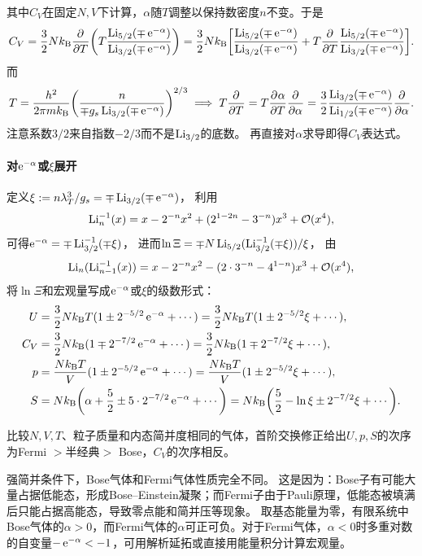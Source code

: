 其中$C_V$在固定$N,V$下计算，$\alpha$随$T$调整以保持数密度$n$不变。于是
\[
	C_V = \frac32Nk_{\mathrm{B}}\frac{\partial^{}}{\partial{T}^{}}\biggl(T\frac{\operatorname{Li}_{5/2}(\mp\mathop{}\!\mathrm{e}^{-\alpha})}{\operatorname{Li}_{3/2}(\mp\mathop{}\!\mathrm{e}^{-\alpha})}\biggr) = \frac32Nk_{\mathrm{B}}\biggl[\frac{\operatorname{Li}_{5/2}(\mp\mathop{}\!\mathrm{e}^{-\alpha})}{\operatorname{Li}_{3/2}(\mp\mathop{}\!\mathrm{e}^{-\alpha})} + T\frac{\partial^{}}{\partial{T}^{}}\frac{\operatorname{Li}_{5/2}(\mp\mathop{}\!\mathrm{e}^{-\alpha})}{\operatorname{Li}_{3/2}(\mp\mathop{}\!\mathrm{e}^{-\alpha})}\biggr].
\]
而
\[
	T = \frac{h^2}{2\pi mk_{\mathrm{B}}}\biggl(\frac{n}{\mp g_s\operatorname{Li}_{3/2}(\mp\mathop{}\!\mathrm{e}^{-\alpha})}\biggr)^{2/3}
	\implies
	T\frac{\partial^{}}{\partial{T}^{}} = T\frac{\partial^{}\alpha}{\partial{T}^{}}\frac{\partial^{}}{\partial{\alpha}^{}} = \frac32\frac{\operatorname{Li}_{3/2}(\mp\mathop{}\!\mathrm{e}^{-\alpha})}{\operatorname{Li}_{1/2}(\mp\mathop{}\!\mathrm{e}^{-\alpha})}\frac{\partial^{}}{\partial{\alpha}^{}}.
\]
注意系数$3/2$来自指数$-2/3$而不是$\operatorname{Li}_{3/2}$的底数。
再直接对$\alpha$求导即得$C_V$表达式。

\paragraph{对$\mathop{}\!\mathrm{e}^{-\alpha}$或$\xi$展开}

定义$\xi := n\lambda_T^3/g_s = \mp\operatorname{Li}_{3/2}(\mp\mathop{}\!\mathrm{e}^{-\alpha})$，
利用
\[
	\operatorname{Li}_n^{-1}(x) = x - 2^{-n}x^2 + (2^{1-2n} - 3^{-n})x^3 + \mathcal{O}(x^4),
\]
可得$\mathop{}\!\mathrm{e}^{-\alpha} = \mp\operatorname{Li}_{3/2}^{-1}(\mp\xi)$，
进而$\ln\Xi = \mp N\operatorname{Li}_{5/2}(\operatorname{Li}_{3/2}^{-1}(\mp\xi))/\xi$，
由
\[
	\operatorname{Li}_n(\operatorname{Li}_{n-1}^{-1}(x)) = x - 2^{-n}x^2 - (2 \cdot 3^{-n} - 4^{1-n})x^3 + \mathcal{O}(x^4),
\]
将$\ln\Xi$和宏观量写成$\mathop{}\!\mathrm{e}^{-\alpha}$或$\xi$的级数形式：
\begin{subequations}
	\begin{align}
		U &= \frac32Nk_{\mathrm{B}} T(1 \pm 2^{-5/2}\mathop{}\!\mathrm{e}^{-\alpha} + \cdots) = \frac32Nk_{\mathrm{B}} T(1 \pm 2^{-5/2}\xi + \cdots),\\
		C_V &= \frac32Nk_{\mathrm{B}}(1 \mp 2^{-7/2}\mathop{}\!\mathrm{e}^{-\alpha} + \cdots) = \frac32Nk_{\mathrm{B}}(1 \mp 2^{-7/2}\xi + \cdots),\\
		p &= \frac{Nk_{\mathrm{B}} T}V(1 \pm 2^{-5/2}\mathop{}\!\mathrm{e}^{-\alpha} + \cdots) = \frac{Nk_{\mathrm{B}} T}V(1 \pm 2^{-5/2}\xi + \cdots),\\
		S &= Nk_{\mathrm{B}}\biggl(\alpha + \frac52 \pm 5 \cdot 2^{-7/2}\mathop{}\!\mathrm{e}^{-\alpha} + \cdots\biggr) = Nk_{\mathrm{B}}\biggl(\frac52 - \ln\xi \pm 2^{-7/2}\xi + \cdots\biggr).
	\end{align}
\end{subequations}

\begin{corollary}
	比较$N,V,T$、粒子质量和内态简并度相同的气体，首阶交换修正给出$U,p,S$的次序为Fermi $>$半经典$>$ Bose，$C_V$的次序相反。
\end{corollary}

\begin{remark}
	强简并条件下，Bose气体和Fermi气体性质完全不同。
	这是因为：Bose子有可能大量占据低能态，形成Bose--Einstein凝聚；而Fermi子由于Pauli原理，低能态被填满后只能占据高能态，导致零点能和简并压等现象。
	取基态能量为零，有限系统中Bose气体的$\alpha > 0$，而Fermi气体的$\alpha$可正可负。对于Fermi气体，$\alpha < 0$时多重对数的自变量$-\mathop{}\!\mathrm{e}^{-\alpha} < -1$，可用解析延拓或直接用能量积分计算宏观量。
\end{remark}

